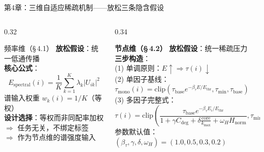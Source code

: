 \documentclass[aspectratio=169,9pt,xcolor=dvipsnames]{beamer}
\newcommand{\highlight}[1]{\textcolor{myred}{\textbf{#1}}}
\newcommand{\blue}[1]{\textcolor{mynavy}{#1}}
\begin{document}
\begin{frame}{第4章：三维自适应稀疏机制——放松三条隐含假设}
\begin{columns}[T]

\begin{column}{0.32\textwidth}
  \begin{block}{\blue{频率维（§\,4.1）}}
    \small
    \textbf{放松假设}：统一低通传播\\[4pt]
    \textbf{核心公式}：
    \begin{equation*}
      E_{\mathrm{spectral}}(i)
      =\frac{1}{K}\sum_{k=1}^{K}\lambda_k|U_{ik}|^2
    \end{equation*}
    谱输入权重 $w_k(i)=1/K$（等权）\\[4pt]
    \textbf{设计选择}：等权而非同配率加权\\
    $\Rightarrow$ 任务无关，不绑定标签\\
    $\Rightarrow$ 作为节点维的谱强度输入
  \end{block}
\end{column}

\begin{column}{0.34\textwidth}
  \begin{alertblock}{\highlight{节点维（§\,4.2）}}
    \small
    \textbf{放松假设}：统一稀疏压力\\[4pt]
    \textbf{三步构造}：\\
    (1) 单调原则：$E\uparrow\Rightarrow\tau(i)\downarrow$\\
    (2) 单因子基线：$\tau_{\mathrm{mono}}(i)=\mathrm{clip}(\tau_{\mathrm{base}} e^{-\beta_\tau E/E_{\mathrm{thr}}},\tau_{\min},\tau_{\mathrm{base}})$\\[2pt]
    (3) 多因子完整式：
    {\tiny
    \begin{equation*}
      \tau(i)=\mathrm{clip}\!\left(
      \frac{\tau_{\mathrm{base}} e^{-\beta_\tau E_i/E_{\mathrm{thr}}}}
           {1+\gamma C_{\mathrm{deg}}+\delta\frac{\mathrm{core}}{k_{\max}}+\omega_H H_{\mathrm{norm}}},
      \tau_{\min},\tau_{\mathrm{base}}\!\right)
    \end{equation*}
    }
    参数默认值：$(\beta_\tau,\gamma,\delta,\omega_H)=(1.0,0.5,0.3,0.2)$
  \end{alertblock}
\end{column}


\end{columns}
\end{frame}
\end{document}
